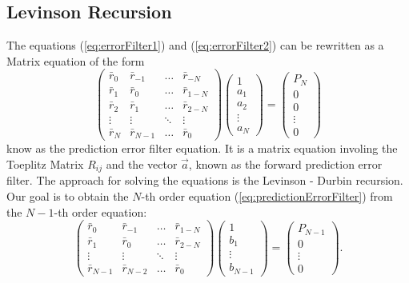 \documentclass[twocolumn,showpacs,preprintnumbers,nofootinbib,prd,
superscriptaddress,10pt]{revtex4-1}
\begin{document}
\subsection{Levinson Recursion}
The equations (\ref{eq:errorFilter1}) and (\ref{eq:errorFilter2}) can be rewritten as a Matrix equation of the form
\begin{equation}\label{eq:predictionErrorFilter}
    \begin{pmatrix}
    \bar r_0 &  \bar r_{-1} & \dots & \bar r_{-N}\\
    \bar r_{1} & \bar r_ 0 & \dots & \bar r_{1 - N} \\ 
    \bar r_{2} & \bar r_{1} & \dots & \bar r_{2 - N}
    \\
    \vdots & \vdots & \ddots & \vdots  \\
    \bar r_{N} & \bar r_{N - 1} & \dots  &\bar r_0
    \end{pmatrix}
    \begin{pmatrix}
    1 \\   a_1 \\   a_ 2 \\  \vdots \\   a_N
    \end{pmatrix} = 
    \begin{pmatrix}
    P_N \\   0 \\  0 \\ \vdots  \\   0
    \end{pmatrix}
\end{equation}
know as the prediction error filter equation. It is a matrix equation involing the Toeplitz Matrix $R_{ij}$ and the vector $\vec a$, known as the forward prediction error filter. The approach for solving the equations is the Levinson - Durbin recursion. \\
Our goal is to obtain the $N$-th order equation (\ref{eq:predictionErrorFilter}) from the $N-1$-th order equation: 
\begin{equation}\label{eq:Forward}
    \begin{pmatrix}
    \bar r_0 & \bar r_{-1} & \dots &\bar r_{1 - N}\\
    \bar r_{1} & \bar r_0 & \dots & \bar r_{2 - N} \\ 
    \vdots & \vdots & \ddots & \vdots \\ 
    \bar r_{N - 1} & \bar r_{N -2} & \dots & \bar r_0
    \end{pmatrix} 
    \begin{pmatrix}
    1  \\   b_1  \\  \vdots \\   b_{N - 1}
    \end{pmatrix} =
    \begin{pmatrix}
    P_{N -1} \\  0 \\ \vdots \\ 0
    \end{pmatrix} .
\end{equation}
\end{document}
